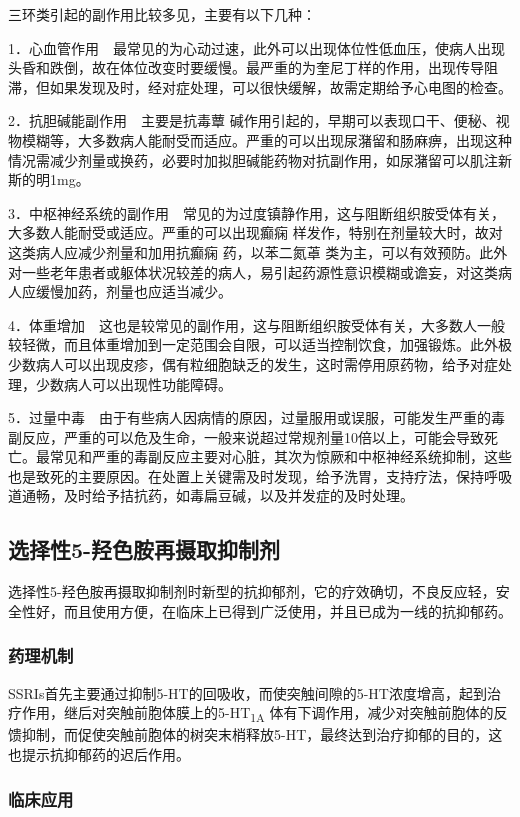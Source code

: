 三环类引起的副作用比较多见，主要有以下几种：

1．心血管作用　最常见的为心动过速，此外可以出现体位性低血压，使病人出现头昏和跌倒，故在体位改变时要缓慢。最严重的为奎尼丁样的作用，出现传导阻滞，但如果发现及时，经对症处理，可以很快缓解，故需定期给予心电图的检查。

2．抗胆碱能副作用　主要是抗毒蕈
碱作用引起的，早期可以表现口干、便秘、视物模糊等，大多数病人能耐受而适应。严重的可以出现尿潴留和肠麻痹，出现这种情况需减少剂量或换药，必要时加拟胆碱能药物对抗副作用，如尿潴留可以肌注新斯的明1mg。

3．中枢神经系统的副作用　常见的为过度镇静作用，这与阻断组织胺受体有关，大多数人能耐受或适应。严重的可以出现癫痫
样发作，特别在剂量较大时，故对这类病人应减少剂量和加用抗癫痫
药，以苯二氮䓬
类为主，可以有效预防。此外对一些老年患者或躯体状况较差的病人，易引起药源性意识模糊或谵妄，对这类病人应缓慢加药，剂量也应适当减少。

4．体重增加　这也是较常见的副作用，这与阻断组织胺受体有关，大多数人一般较轻微，而且体重增加到一定范围会自限，可以适当控制饮食，加强锻炼。此外极少数病人可以出现皮疹，偶有粒细胞缺乏的发生，这时需停用原药物，给予对症处理，少数病人可以出现性功能障碍。

5．过量中毒　由于有些病人因病情的原因，过量服用或误服，可能发生严重的毒副反应，严重的可以危及生命，一般来说超过常规剂量10倍以上，可能会导致死亡。最常见和严重的毒副反应主要对心脏，其次为惊厥和中枢神经系统抑制，这些也是致死的主要原因。在处置上关键需及时发现，给予洗胃，支持疗法，保持呼吸道通畅，及时给予拮抗药，如毒扁豆碱，以及并发症的及时处理。

\subsection{选择性5-羟色胺再摄取抑制剂}

选择性5-羟色胺再摄取抑制剂时新型的抗抑郁剂，它的疗效确切，不良反应轻，安全性好，而且使用方便，在临床上已得到广泛使用，并且已成为一线的抗抑郁药。

\subsubsection{药理机制}

SSRIs首先主要通过抑制5-HT的回吸收，而使突触间隙的5-HT浓度增高，起到治疗作用，继后对突触前胞体膜上的5-HT\textsubscript{1A}
体有下调作用，减少对突触前胞体的反馈抑制，而促使突触前胞体的树突末梢释放5-HT，最终达到治疗抑郁的目的，这也提示抗抑郁药的迟后作用。

\subsubsection{临床应用}

